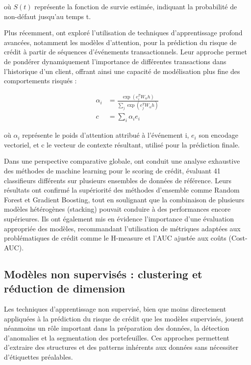 où $S(t)$ représente la fonction de survie estimée, indiquant la probabilité de non-défaut jusqu'au temps t.

Plus récemment, \citet{babaev2019} ont exploré l'utilisation de techniques d'apprentissage profond avancées, notamment les modèles d'attention, pour la prédiction du risque de crédit à partir de séquences d'événements transactionnels. Leur approche permet de pondérer dynamiquement l'importance de différentes transactions dans l'historique d'un client, offrant ainsi une capacité de modélisation plus fine des comportements risqués :

\begin{align}
\alpha_i &= \frac{\exp(e_i^T W_{\alpha} h)}{\sum_j \exp(e_j^T W_{\alpha} h)}\\
c &= \sum_i \alpha_i e_i
\end{align}

où $\alpha_i$ représente le poids d'attention attribué à l'événement i, $e_i$ son encodage vectoriel, et c le vecteur de contexte résultant, utilisé pour la prédiction finale.

Dans une perspective comparative globale, \citet{lessmann2015} ont conduit une analyse exhaustive des méthodes de machine learning pour le scoring de crédit, évaluant 41 classifieurs différents sur plusieurs ensembles de données de référence. Leurs résultats ont confirmé la supériorité des méthodes d'ensemble comme Random Forest et Gradient Boosting, tout en soulignant que la combinaison de plusieurs modèles hétérogènes (stacking) pouvait conduire à des performances encore supérieures. Ils ont également mis en évidence l'importance d'une évaluation appropriée des modèles, recommandant l'utilisation de métriques adaptées aux problématiques de crédit comme le H-measure et l'AUC ajustée aux coûts (Cost-AUC).

\subsection{Modèles non supervisés : clustering et réduction de dimension}

Les techniques d'apprentissage non supervisé, bien que moins directement appliquées à la prédiction du risque de crédit que les modèles supervisés, jouent néanmoins un rôle important dans la préparation des données, la détection d'anomalies et la segmentation des portefeuilles. Ces approches permettent d'extraire des structures et des patterns inhérents aux données sans nécessiter d'étiquettes préalables.

